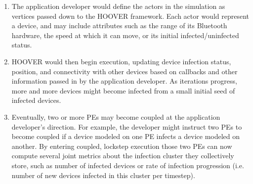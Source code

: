 \begin{enumerate}
    \item The application developer would define the actors in the simulation as
        vertices passed down to the HOOVER framework. Each actor would represent
        a device, and may include attributes such as the range of its Bluetooth
        hardware, the speed at which it can move, or its initial
        infected/uninfected status.
    \item HOOVER would then begin execution, updating device infection status,
        position, and connectivity with other devices based on callbacks and
        other information passed in by the application developer. As iterations
        progress, more and more devices might become infected from a small
        initial seed of infected devices.
    \item Eventually, two or more PEs may become coupled at the application
        developer's direction. For example, the developer might instruct two PEs
        to become coupled if a device modeled on one PE infects a device modeled
        on another. By entering coupled, lockstep execution those two PEs can
        now compute several joint metrics about the infection cluster they
        collectively store, such as number of infected devices or rate of
        infection progression (i.e. number of new devices infected in this
        cluster per timestep).
\end{enumerate}
